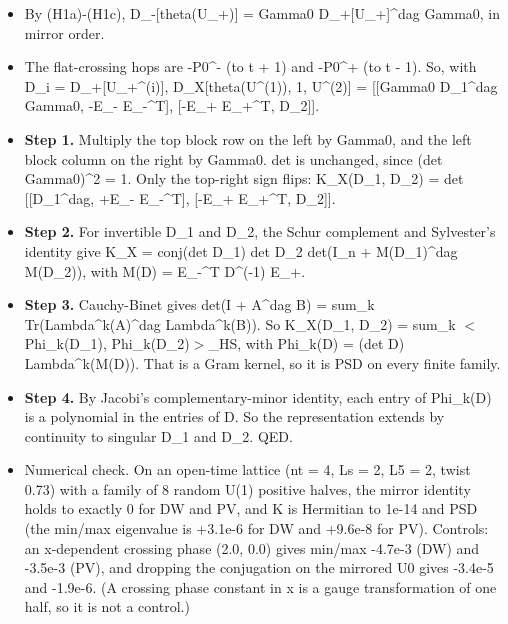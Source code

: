 \documentclass[11pt,a4paper]{article}
\begin{document}
\begin{itemize}
\begin{itemize}
\item{} By (H1a)-(H1c), D\_-[theta(U\_+)] = Gamma0 D\_+[U\_+]\textasciicircum{}dag Gamma0, in mirror order.
\item{} The flat-crossing hops are -P0\textasciicircum{}- (to t + 1) and -P0\textasciicircum{}+ (to t - 1). So, with D\_i = D\_+[U\_+\textasciicircum{}(i)],
D\_X[theta(U\textasciicircum{}(1)), 1, U\textasciicircum{}(2)] = [[Gamma0 D\_1\textasciicircum{}dag Gamma0, -E\_- E\_-\textasciicircum{}T], [-E\_+ E\_+\textasciicircum{}T, D\_2]].
\item{} {\bfseries\boldmath Step 1.} Multiply the top block row on the left by Gamma0, and the left block column on the right by
Gamma0. det is unchanged, since (det Gamma0)\textasciicircum{}2 = 1. Only the top-right sign flips:
K\_X(D\_1, D\_2) = det [[D\_1\textasciicircum{}dag, +E\_- E\_-\textasciicircum{}T], [-E\_+ E\_+\textasciicircum{}T, D\_2]].
\item{} {\bfseries\boldmath Step 2.} For invertible D\_1 and D\_2, the Schur complement and Sylvester's identity give
K\_X = conj(det D\_1) det D\_2 det(I\_n + M(D\_1)\textasciicircum{}dag M(D\_2)), with M(D) = E\_-\textasciicircum{}T D\textasciicircum{}(-1) E\_+.
\item{} {\bfseries\boldmath Step 3.} Cauchy-Binet gives det(I + A\textasciicircum{}dag B) = sum\_k Tr(Lambda\textasciicircum{}k(A)\textasciicircum{}dag Lambda\textasciicircum{}k(B)). So
K\_X(D\_1, D\_2) = sum\_k $<$Phi\_k(D\_1), Phi\_k(D\_2)$>$\_HS, with Phi\_k(D) = (det D) Lambda\textasciicircum{}k(M(D)). That is a Gram
kernel, so it is PSD on every finite family.
\item{} {\bfseries\boldmath Step 4.} By Jacobi's complementary-minor identity, each entry of Phi\_k(D) is a polynomial in the entries of D.
So the representation extends by continuity to singular D\_1 and D\_2. QED.
\item{} Numerical check. On an open-time lattice (nt = 4, Ls = 2, L5 = 2, twist 0.73) with a family of 8 random U(1)
positive halves, the mirror identity holds to exactly 0 for DW and PV, and K is Hermitian to 1e-14 and PSD (the
min/max eigenvalue is +3.1e-6 for DW and +9.6e-8 for PV). Controls: an x-dependent crossing phase (2.0, 0.0)
gives min/max -4.7e-3 (DW) and -3.5e-3 (PV), and dropping the conjugation on the mirrored U0 gives -3.4e-5 and
-1.9e-6. (A crossing phase constant in x is a gauge transformation of one half, so it is not a control.)
\end{itemize}

\end{itemize}
\end{document}
